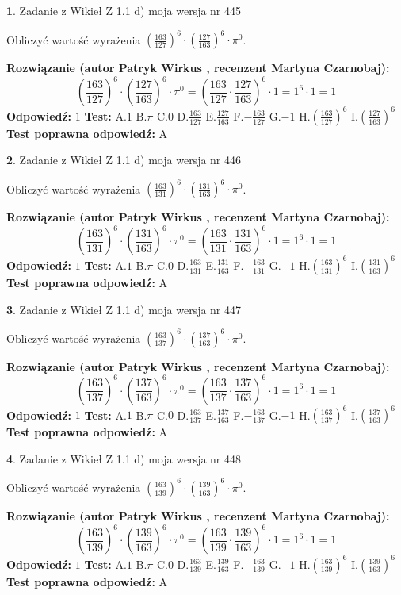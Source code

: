 \documentclass[12pt, a4paper]{article}
\theoremstyle{definition} %
\newtheorem{zad}{}
\newcommand{\zadStart}[1]{\begin{zad}#1\newline}
\newcommand{\zadStop}{\end{zad}}
\newcommand{\rozwStart}[2]{\noindent \textbf{Rozwiązanie (autor #1 , recenzent #2): }\newline}
\newcommand{\rozwStop}{\newline}
\newcommand{\odpStart}{\noindent \textbf{Odpowiedź:}\newline}
\newcommand{\odpStop}{\newline}
\newcommand{\testStart}{\noindent \textbf{Test:}\newline}
\newcommand{\testStop}{\newline}
\newcommand{\kluczStart}{\noindent \textbf{Test poprawna odpowiedź:}\newline}
\newcommand{\kluczStop}{\newline}
\begin{document}
\zadStart{Zadanie z Wikieł Z 1.1 d) moja wersja nr 445}

Obliczyć wartość wyrażenia $(\frac{163}{127})^{6} \cdot (\frac{127}{163})^{6} \cdot \pi^{0}$.
\zadStop
\rozwStart{Patryk Wirkus}{Martyna Czarnobaj}
$$(\frac{163}{127})^{6} \cdot (\frac{127}{163})^{6} \cdot \pi^{0} = (\frac{163}{127} \cdot \frac{127}{163})^{6} \cdot 1 = 1^{6} \cdot 1 = 1$$
\rozwStop
\odpStart
$1$
\odpStop
\testStart
A.$1$ B.$\pi$ C.$0$ D.$\frac{163}{127}$ E.$\frac{127}{163}$
F.$-\frac{163}{127}$ G.$-1$
H.$(\frac{163}{127})^{6}$
I.$(\frac{127}{163})^{6}$
\testStop
\kluczStart
A
\kluczStop



\zadStart{Zadanie z Wikieł Z 1.1 d) moja wersja nr 446}

Obliczyć wartość wyrażenia $(\frac{163}{131})^{6} \cdot (\frac{131}{163})^{6} \cdot \pi^{0}$.
\zadStop
\rozwStart{Patryk Wirkus}{Martyna Czarnobaj}
$$(\frac{163}{131})^{6} \cdot (\frac{131}{163})^{6} \cdot \pi^{0} = (\frac{163}{131} \cdot \frac{131}{163})^{6} \cdot 1 = 1^{6} \cdot 1 = 1$$
\rozwStop
\odpStart
$1$
\odpStop
\testStart
A.$1$ B.$\pi$ C.$0$ D.$\frac{163}{131}$ E.$\frac{131}{163}$
F.$-\frac{163}{131}$ G.$-1$
H.$(\frac{163}{131})^{6}$
I.$(\frac{131}{163})^{6}$
\testStop
\kluczStart
A
\kluczStop



\zadStart{Zadanie z Wikieł Z 1.1 d) moja wersja nr 447}

Obliczyć wartość wyrażenia $(\frac{163}{137})^{6} \cdot (\frac{137}{163})^{6} \cdot \pi^{0}$.
\zadStop
\rozwStart{Patryk Wirkus}{Martyna Czarnobaj}
$$(\frac{163}{137})^{6} \cdot (\frac{137}{163})^{6} \cdot \pi^{0} = (\frac{163}{137} \cdot \frac{137}{163})^{6} \cdot 1 = 1^{6} \cdot 1 = 1$$
\rozwStop
\odpStart
$1$
\odpStop
\testStart
A.$1$ B.$\pi$ C.$0$ D.$\frac{163}{137}$ E.$\frac{137}{163}$
F.$-\frac{163}{137}$ G.$-1$
H.$(\frac{163}{137})^{6}$
I.$(\frac{137}{163})^{6}$
\testStop
\kluczStart
A
\kluczStop



\zadStart{Zadanie z Wikieł Z 1.1 d) moja wersja nr 448}

Obliczyć wartość wyrażenia $(\frac{163}{139})^{6} \cdot (\frac{139}{163})^{6} \cdot \pi^{0}$.
\zadStop
\rozwStart{Patryk Wirkus}{Martyna Czarnobaj}
$$(\frac{163}{139})^{6} \cdot (\frac{139}{163})^{6} \cdot \pi^{0} = (\frac{163}{139} \cdot \frac{139}{163})^{6} \cdot 1 = 1^{6} \cdot 1 = 1$$
\rozwStop
\odpStart
$1$
\odpStop
\testStart
A.$1$ B.$\pi$ C.$0$ D.$\frac{163}{139}$ E.$\frac{139}{163}$
F.$-\frac{163}{139}$ G.$-1$
H.$(\frac{163}{139})^{6}$
I.$(\frac{139}{163})^{6}$
\testStop
\kluczStart
A
\kluczStop
\end{document}
